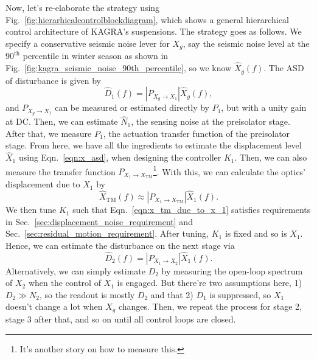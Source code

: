Now, let's re-elaborate the strategy using Fig.~\ref{fig:hierarhicalcontrolblockdiagram}, which shows a general hierarchical control architecture of KAGRA's suspensions.
The strategy goes as follows.
We specify a conservative seismic noise lever for $X_g$, say the seismic noise level at the $90^\mathrm{th}$ percentile in winter season as shown in Fig.~\ref{fig:kagra_seismic_noise_90th_percentile}, so we know $\hat{X}_g(f)$.
The ASD of disturbance is given by
\begin{equation}
	\hat{D}_1(f) = \left\lvert P_{X_g\to X_1} \right\rvert \hat{X}_g(f),
\end{equation}
and $P_{X_g\to X_1}$ can be measured or estimated directly by $P_1$, but with a unity gain at DC.
Then, we can estimate $\hat{N}_1$, the sensing noise at the preisolator stage.
After that, we measure $P_1$, the actuation transfer function of the preisolator stage.
From here, we have all the ingredients to estimate the displacement level $\hat{X}_1$ using Eqn.~\eqref{eqn:x_asd}, when designing the controller $K_1$.
Then, we can also measure the transfer function $P_{X_1\to X_\mathrm{TM}}$\footnote{It's another story on how to measure this.}.
With this, we can calculate the optics' displacement due to $X_1$ by
\begin{equation}
	\hat{X}_\mathrm{TM}(f) \approx \left\lvert P_{X_1\to X_\mathrm{TM}} \right\rvert \hat{X}_1(f).
	\label{eqn:x_tm_due_to_x_1}
\end{equation}
We then tune $K_1$ such that Eqn.~\eqref{eqn:x_tm_due_to_x_1} satisfies requirements in Sec.~\ref{sec:displacement_noise_requirement} and Sec.~\ref{sec:residual_motion_requirement}.
After tuning, $K_1$ is fixed and so is $X_1$.
Hence, we can estimate the disturbance on the next stage via
\begin{equation}
	\hat{D}_2(f) = \left\lvert P_{X_1\to X_2}\right\rvert \hat{X}_1(f).
\end{equation}
Alternatively, we can simply estimate $D_2$ by measuring the open-loop spectrum of $X_2$ when the control of $X_1$ is engaged.
But there're two assumptions here, 1) $D_2\gg N_2$, so the readout is mostly $D_2$ and that 2) $D_1$ is suppressed, so $X_1$ doesn't change a lot when $X_g$ changes.
Then, we repeat the process for stage 2, stage 3 after that, and so on until all control loops are closed.


